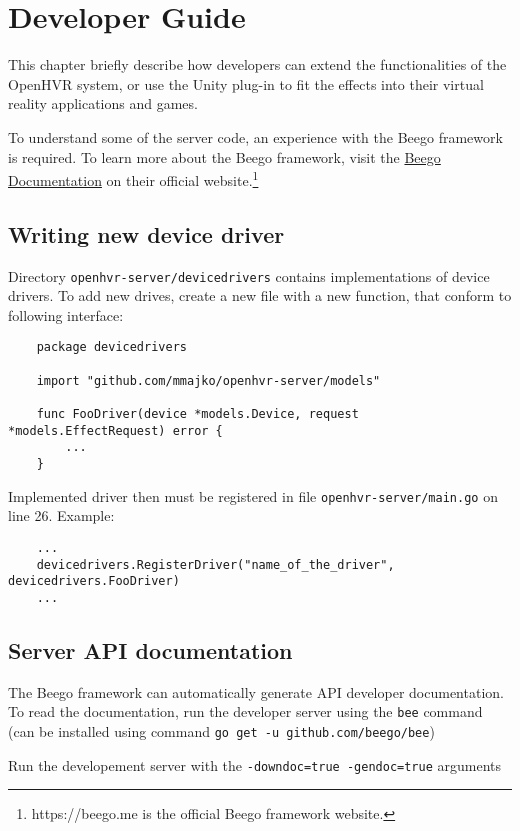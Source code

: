 \chapter{Developer Guide}

This chapter briefly describe how developers can extend the functionalities
of the OpenHVR system, or use the Unity plug-in to fit the effects 
into their virtual reality applications and games.

To understand some of the server code, an experience with the Beego framework
is required. To learn more about the Beego framework, visit the
\hyperlink{https://beego.me/docs/intro/}{Beego Documentation} on their official
website.\footnote{https://beego.me is the official Beego framework website.}

\section*{Writing new device driver}

Directory \verb|openhvr-server/devicedrivers| contains implementations of
device drivers. To add new drives, create a new file with a new function,
that conform to following interface:

\begin{verbatim}
    package devicedrivers

    import "github.com/mmajko/openhvr-server/models"

    func FooDriver(device *models.Device, request *models.EffectRequest) error {
        ...
    }
\end{verbatim}

Implemented driver then must be registered in file \verb|openhvr-server/main.go|
on line 26. Example:

\begin{verbatim}
    ...
    devicedrivers.RegisterDriver("name_of_the_driver", devicedrivers.FooDriver)
    ...
\end{verbatim}

\section*{Server API documentation}

The Beego framework can automatically generate API developer documentation.
To read the documentation, run the developer server using the \verb|bee| command
(can be installed using command \verb|go get -u github.com/beego/bee|)

Run the developement server with the \verb|-downdoc=true -gendoc=true| arguments

